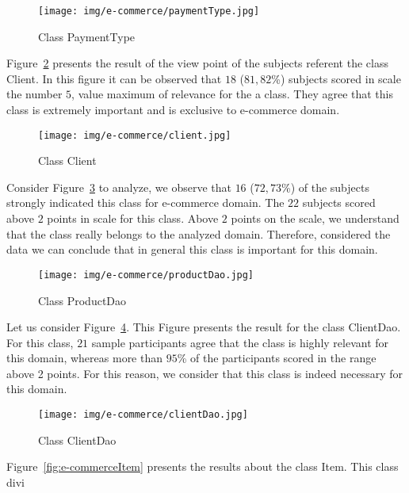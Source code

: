 \begin{figure}[!h]
\centering
\texttt{[image: img/e-commerce/paymentType.jpg]}
\caption{Class PaymentType}
\label{fig:e-commercePaymentType}
\end{figure}


Figure~\ref{fig:e-commerceClient} presents the result of the view point of the subjects referent the class Client. In this figure it can be observed that $18$ ($81,82$\%) subjects scored in scale the number $5$, value maximum of relevance for the a class. They agree that this class is  extremely important and is exclusive to e-commerce domain.  

\begin{figure}[!h]
\centering
\texttt{[image: img/e-commerce/client.jpg]}
\caption{Class Client}
\label{fig:e-commerceClient}
\end{figure}


Consider Figure~\ref{fig:e-commerceProductDao} to analyze, we observe that $16$ ($72,73$\%) of the subjects strongly indicated this class for e-commerce domain. The $22$ subjects scored above $2$ points  in scale for this class. Above $2$ points on the scale, we understand that the class really belongs to the analyzed domain. Therefore, considered the data we can conclude that in general this class is important for this domain.


\begin{figure}[!h]
\centering
\texttt{[image: img/e-commerce/productDao.jpg]}
\caption{Class ProductDao}
\label{fig:e-commerceProductDao}
\end{figure}


Let us consider Figure~\ref{fig:e-commerceClientDao}. This Figure presents  the result for the class ClientDao. For this class, $21$ sample participants agree that the class is  highly relevant for this domain, whereas more than $95$\% of the participants scored in the range above 2 points. For this reason, we consider that this class  is indeed necessary for this domain. 

\begin{figure}[!h]
\centering
\texttt{[image: img/e-commerce/clientDao.jpg]}
\caption{Class ClientDao}
\label{fig:e-commerceClientDao}
\end{figure}



Figure~\ref{fig:e-commerceItem} presents the results about the class Item.  This class divi

